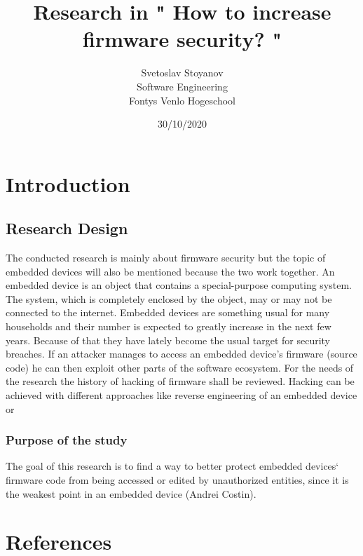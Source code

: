 \documentclass[]{report}
\begin{document}
\title{Research in " How to increase firmware security? " }
\author{Svetoslav Stoyanov \\
	Software Engineering \\
	Fontys Venlo Hogeschool}
\date {30/10/2020}
\maketitle

\tableofcontents
\chapter{Introduction}
\section{Research Design}
The conducted research is mainly about firmware security but the topic of embedded devices will also be mentioned because the two work together. An embedded device is an object that contains a special-purpose computing system. The system, which is completely enclosed by the object, may or may not be connected to the internet.
Embedded devices are something usual for many households and their number is expected to greatly increase in the next few years. Because of that they have lately become the usual target for security breaches. If an attacker manages to access an embedded device's firmware (source code) he can then exploit other parts of the software ecosystem. For the needs of the research the history of hacking of firmware shall be reviewed. Hacking can be achieved with different approaches like reverse engineering of an embedded device or  

\subsection{Purpose of the study} 
The goal of this research is to find a way to better protect embedded devices` firmware code from being accessed or edited by unauthorized entities, since it is the weakest point in an embedded device (Andrei Costin).
\chapter{References}
\end{document}
